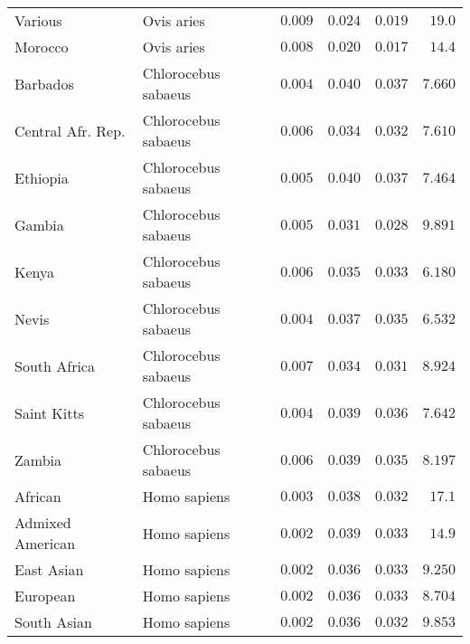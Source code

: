 \documentclass{article}
\begin{document}
\begin{center}
\begin{longtable}{|l|l|r|r|r|r|}
            Various              & Ovis aries          & $ 0.009$              & $ 0.024$ & $ 0.019$            & $  19.0$   \\
            Morocco              & Ovis aries          & $ 0.008$              & $ 0.020$ & $ 0.017$            & $  14.4$   \\
            Barbados             & Chlorocebus sabaeus & $ 0.004$              & $ 0.040$ & $ 0.037$            & $ 7.660$ \\
            Central Afr. Rep.    & Chlorocebus sabaeus & $ 0.006$              & $ 0.034$ & $ 0.032$            & $ 7.610$ \\
            Ethiopia             & Chlorocebus sabaeus & $ 0.005$              & $ 0.040$ & $ 0.037$            & $ 7.464$ \\
            Gambia               & Chlorocebus sabaeus & $ 0.005$              & $ 0.031$ & $ 0.028$            & $ 9.891$ \\
            Kenya                & Chlorocebus sabaeus & $ 0.006$              & $ 0.035$ & $ 0.033$            & $ 6.180$ \\
            Nevis                & Chlorocebus sabaeus & $ 0.004$              & $ 0.037$ & $ 0.035$            & $ 6.532$ \\
            South Africa         & Chlorocebus sabaeus & $ 0.007$              & $ 0.034$ & $ 0.031$            & $ 8.924$ \\
            Saint Kitts          & Chlorocebus sabaeus & $ 0.004$              & $ 0.039$ & $ 0.036$            & $ 7.642$ \\
            Zambia               & Chlorocebus sabaeus & $ 0.006$              & $ 0.039$ & $ 0.035$            & $ 8.197$ \\
            African              & Homo sapiens        & $ 0.003$              & $ 0.038$ & $ 0.032$            & $  17.1$   \\
            Admixed American     & Homo sapiens        & $ 0.002$              & $ 0.039$ & $ 0.033$            & $  14.9$   \\
            East Asian           & Homo sapiens        & $ 0.002$              & $ 0.036$ & $ 0.033$            & $ 9.250$ \\
            European             & Homo sapiens        & $ 0.002$              & $ 0.036$ & $ 0.033$            & $ 8.704$ \\
            South Asian          & Homo sapiens        & $ 0.002$              & $ 0.036$ & $ 0.032$            & $ 9.853$ \\
        \end{longtable}

    \end{center}
\end{document}
